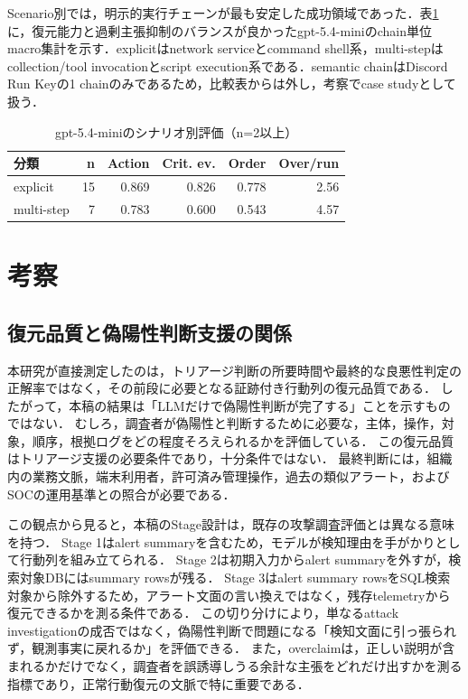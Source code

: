\documentclass[a4paper,twocolumn,10pt]{article}
\newcommand{\code}[1]{{\small\ttfamily #1}}
\begin{document}

Scenario別では，明示的実行チェーンが最も安定した成功領域であった．表\ref{tab:scenario_result}に，復元能力と過剰主張抑制のバランスが良かった\code{gpt-5.4-mini}のchain単位macro集計を示す．explicitはnetwork serviceとcommand shell系，multi-stepはcollection/tool invocationとscript execution系である．semantic chainはDiscord Run Keyの1 chainのみであるため，比較表からは外し，考察でcase studyとして扱う．

\begin{table}[t]
\centering
\footnotesize
\caption{gpt-5.4-miniのシナリオ別評価（n=2以上）}
\label{tab:scenario_result}
\setlength{\tabcolsep}{2pt}
\begin{tabular}{@{}lrrrrr@{}}
\toprule
分類 & n & Action & Crit. ev. & Order & Over/run \\
\midrule
explicit & 15 & 0.869 & 0.826 & 0.778 & 2.56 \\
multi-step & 7 & 0.783 & 0.600 & 0.543 & 4.57 \\
\bottomrule
\end{tabular}
\end{table}

\section{考察}

\subsection{復元品質と偽陽性判断支援の関係}

本研究が直接測定したのは，トリアージ判断の所要時間や最終的な良悪性判定の正解率ではなく，その前段に必要となる証跡付き行動列の復元品質である．
したがって，本稿の結果は「LLMだけで偽陽性判断が完了する」ことを示すものではない．
むしろ，調査者が偽陽性と判断するために必要な，主体，操作，対象，順序，根拠ログをどの程度そろえられるかを評価している．
この復元品質はトリアージ支援の必要条件であり，十分条件ではない．
最終判断には，組織内の業務文脈，端末利用者，許可済み管理操作，過去の類似アラート，およびSOCの運用基準との照合が必要である．

この観点から見ると，本稿のStage設計は，既存の攻撃調査評価とは異なる意味を持つ．
Stage 1はalert summaryを含むため，モデルが検知理由を手がかりとして行動列を組み立てられる．
Stage 2は初期入力からalert summaryを外すが，検索対象DBにはsummary rowsが残る．
Stage 3はalert summary rowsをSQL検索対象から除外するため，アラート文面の言い換えではなく，残存telemetryから復元できるかを測る条件である．
この切り分けにより，単なるattack investigationの成否ではなく，偽陽性判断で問題になる「検知文面に引っ張られず，観測事実に戻れるか」を評価できる．
また，overclaimは，正しい説明が含まれるかだけでなく，調査者を誤誘導しうる余計な主張をどれだけ出すかを測る指標であり，正常行動復元の文脈で特に重要である．
\end{document}
